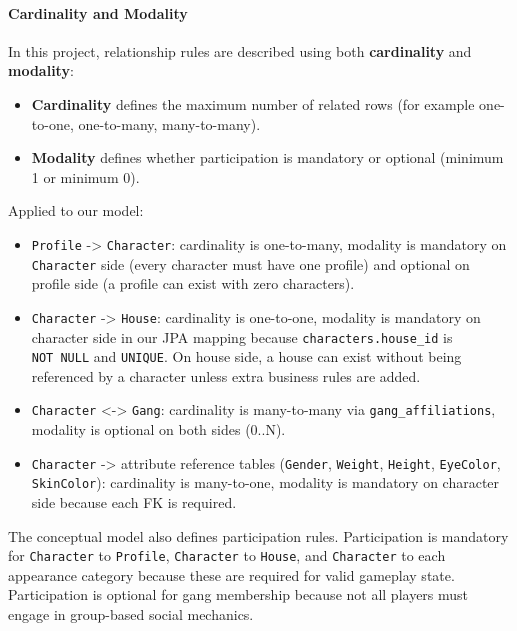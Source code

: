 \hypertarget{cardinality-and-modality}{%
\paragraph{Cardinality and Modality}\label{cardinality-and-modality}}

In this project, relationship rules are described using both
\textbf{cardinality} and \textbf{modality}:

\begin{itemize}
\tightlist
\item
  \textbf{Cardinality} defines the maximum number of related rows (for
  example one-to-one, one-to-many, many-to-many).
\item
  \textbf{Modality} defines whether participation is mandatory or
  optional (minimum 1 or minimum 0).
\end{itemize}

Applied to our model:

\begin{itemize}
\tightlist
\item
  \texttt{Profile} -\textgreater{} \texttt{Character}: cardinality is
  one-to-many, modality is mandatory on \texttt{Character} side (every
  character must have one profile) and optional on profile side (a
  profile can exist with zero characters).
\item
  \texttt{Character} -\textgreater{} \texttt{House}: cardinality is
  one-to-one, modality is mandatory on character side in our JPA mapping
  because \texttt{characters.house\_id} is \texttt{NOT\ NULL} and
  \texttt{UNIQUE}. On house side, a house can exist without being
  referenced by a character unless extra business rules are added.
\item
  \texttt{Character} \textless-\textgreater{} \texttt{Gang}: cardinality
  is many-to-many via \texttt{gang\_affiliations}, modality is optional
  on both sides (0..N).
\item
  \texttt{Character} -\textgreater{} attribute reference tables
  (\texttt{Gender}, \texttt{Weight}, \texttt{Height}, \texttt{EyeColor},
  \texttt{SkinColor}): cardinality is many-to-one, modality is mandatory
  on character side because each FK is required.
\end{itemize}

The conceptual model also defines participation rules. Participation is
mandatory for \texttt{Character} to \texttt{Profile}, \texttt{Character}
to \texttt{House}, and \texttt{Character} to each appearance category
because these are required for valid gameplay state. Participation is
optional for gang membership because not all players must engage in
group-based social mechanics.

